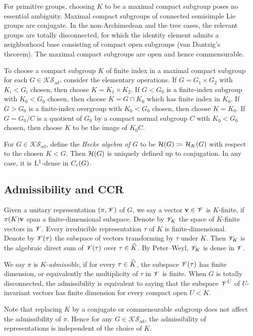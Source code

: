 \documentclass[a4paper, 10pt]{article}
\newcommand{\aks}{\mathcal{KS}_{\mathrm{ad}}}
\begin{document}
For primitive groups, choosing $K$ to be a maximal compact subgroup poses no essential ambiguity.
Maximal compact subgroups of connected semisimple Lie groups are conjugate. In the non-Archimedean and the tree cases, the relevant groups are totally disconnected, for which the identity element admits a neighborhood base consisting of compact open subgroups (van Dantzig's theorem). The maximal compact subgroups are open and hence commensurable.

To choose a compact subgroup $K$ of finite index in a maximal compact subgroup for each $G\in\aks$, consider the elementary operations.
If $G=G_1\times G_2$ with $K_i < G_i$ chosen, then choose $K=K_1\times K_2$. 
If $G<G_0$ is a finite-index subgroup with $K_0<G_0$ chosen, then choose $K=G\cap K_0$ which has finite index in $K_0$.
If $G>G_0$ is a finite-index overgroup with $K_0<G_0$ chosen, then choose $K=K_0$.
If $G=G_0/C$ is a quotient of $G_0$ by a compact normal subgroup $C$ with $K_0<G_0$ chosen, then choose $K$ to be the image of $K_0C$.

For $G\in\aks$, define the \emph{Hecke algebra of $G$} to be $\mathcal{H}(G)\coloneq \mathcal{H}_K(G)$ with respect to the chosen $K<G$. Then $\mathcal{H}(G)$ is uniquely defined up to conjugation. In any case, it is $\mathrm{L}^1$-dense in $C_{\mathrm{c}}(G)$.

\subsection{Admissibility and CCR}
Given a unitary representation $(\pi,\mathscr{V})$ of $G$, we say a vector $\mathbf{v}\in \mathscr{V}$ is $K$-finite, if $\pi(K)\mathbf{v}$ span a finite-dimensional subspace. Denote by $\mathscr{V}_K$ the space of $K$-finite vectors in $\mathscr{V}$. 
Every irreducible representation $\tau$ of $K$ is finite-dimensional.
Denote by $\mathscr{V}(\tau)$ the subspace of vectors transforming by $\tau$ under $K$. Then $\mathscr{V}_K$ is the algebraic direct sum of $\mathscr{V}(\tau)$ over $\tau\in\widehat{K}$.
By Peter--Weyl, $\mathscr{V}_K$ is dense in $\mathscr{V}$.

We say $\pi$ is \emph{$K$-admissible}, if for every $\tau\in\widehat{K}$, the subspace $\mathscr{V}(\tau)$ has finite dimension, or equivalently the multiplicity of $\tau$ in $\mathscr{V}$ is finite.
When $G$ is totally disconnected, the admissibility is equivalent to saying that the subspace $\mathscr{V}^U$ of $U$-invariant vectors has finite dimension for every compact open $U<K$.

Note that replacing $K$ by a conjugate or commensurable subgroup does not affect the admissibility of $\pi$. 
Hence for any $G\in\aks$, the admissibility of representations is independent of the choice of $K$.
\end{document}

